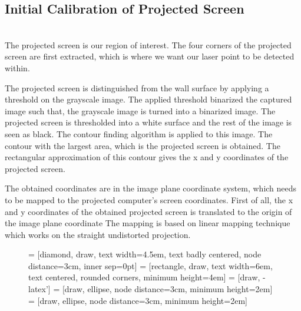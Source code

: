 \documentclass[12pt, a4paper]{article}
\begin{document}
{\subsection{Initial Calibration of Projected Screen}
~\\
	 The projected screen is our region of interest. The four corners of the projected screen are first extracted, which is where we want our laser point to be detected within. 
	 
    The projected screen is distinguished from the wall surface by applying a threshold on the grayscale image. The applied threshold binarized the captured image such that, the grayscale image is turned into a binarized image. The projected screen is thresholded into a white surface and the rest of the image is seen as black. The contour finding algorithm is applied to this image. The contour with the largest area, which is the projected screen is obtained. The rectangular approximation of this contour gives the x and y coordinates of the projected screen. 
 
    The obtained coordinates are in the image plane coordinate system, which needs to be mapped to the projected computer’s screen coordinates. First of all, the x and y coordinates of the obtained projected screen is translated to the origin of the image plane coordinate 
The mapping is based on linear mapping technique which works on the straight undistorted projection. 

\begin{figure}
\centering	 
{} = [diamond, draw, text width=4.5em, text badly centered, node distance=3cm, inner sep=0pt]
 = [rectangle, draw, text width=6em, text centered, rounded corners, minimum height=4em]
 = [draw, -latex']
 = [draw, ellipse, node distance=3cm,
    minimum height=2em]
 = [draw, ellipse, node distance=3cm,
    minimum height=2em]
    
\end{figure}}
\end{document}
